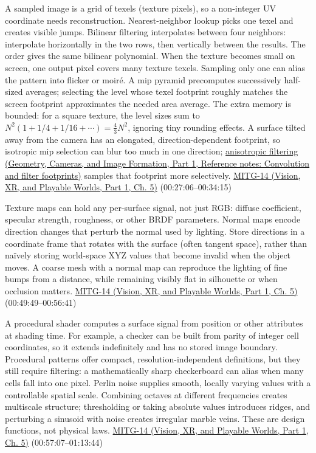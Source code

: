 A sampled image is a grid of texels (texture pixels), so a non-integer UV coordinate needs reconstruction. Nearest-neighbor lookup picks one texel and creates visible jumps. Bilinear filtering interpolates between four neighbors: interpolate horizontally in the two rows, then vertically between the results. The order gives the same bilinear polynomial. When the texture becomes small on screen, one output pixel covers many texture texels. Sampling only one can alias the pattern into flicker or moiré. A mip pyramid precomputes successively half-sized averages; selecting the level whose texel footprint roughly matches the screen footprint approximates the needed area average. The extra memory is bounded: for a square texture, the level sizes sum to \(N^2(1+1/4+1/16+\cdots)=\frac43N^2\), ignoring tiny rounding effects. A surface tilted away from the camera has an elongated, direction-dependent footprint, so isotropic mip selection can blur too much in one direction; \href{../03-Geometry-Cameras-and-Image-Formation-P01/main.pdf\#nameddest=appendix-d5b3c692d9f0}{anisotropic filtering (Geometry, Cameras, and Image Formation, Part 1, Reference notes: Convolution and filter footprints)} samples that footprint more selectively. \href{../07-Vision-XR-and-Playable-Worlds-P01/main.pdf\#nameddest=04-visual-computing-ii-ch036-mitg-14---texture-mapping}{MITG-14 (Vision, XR, and Playable Worlds, Part 1, Ch. 5)} (00:27:06--00:34:15)

Texture maps can hold any per-surface signal, not just RGB: diffuse coefficient, specular strength, roughness, or other BRDF parameters. Normal maps encode direction changes that perturb the normal used by lighting. Store directions in a coordinate frame that rotates with the surface (often tangent space), rather than naïvely storing world-space XYZ values that become invalid when the object moves. A coarse mesh with a normal map can reproduce the lighting of fine bumps from a distance, while remaining visibly flat in silhouette or when occlusion matters. \href{../07-Vision-XR-and-Playable-Worlds-P01/main.pdf\#nameddest=04-visual-computing-ii-ch036-mitg-14---texture-mapping}{MITG-14 (Vision, XR, and Playable Worlds, Part 1, Ch. 5)} (00:49:49--00:56:41)

A procedural shader computes a surface signal from position or other attributes at shading time. For example, a checker can be built from parity of integer cell coordinates, so it extends indefinitely and has no stored image boundary. Procedural patterns offer compact, resolution-independent definitions, but they still require filtering: a mathematically sharp checkerboard can alias when many cells fall into one pixel. Perlin noise supplies smooth, locally varying values with a controllable spatial scale. Combining octaves at different frequencies creates multiscale structure; thresholding or taking absolute values introduces ridges, and perturbing a sinusoid with noise creates irregular marble veins. These are design functions, not physical laws. \href{../07-Vision-XR-and-Playable-Worlds-P01/main.pdf\#nameddest=04-visual-computing-ii-ch036-mitg-14---texture-mapping}{MITG-14 (Vision, XR, and Playable Worlds, Part 1, Ch. 5)} (00:57:07--01:13:44)

